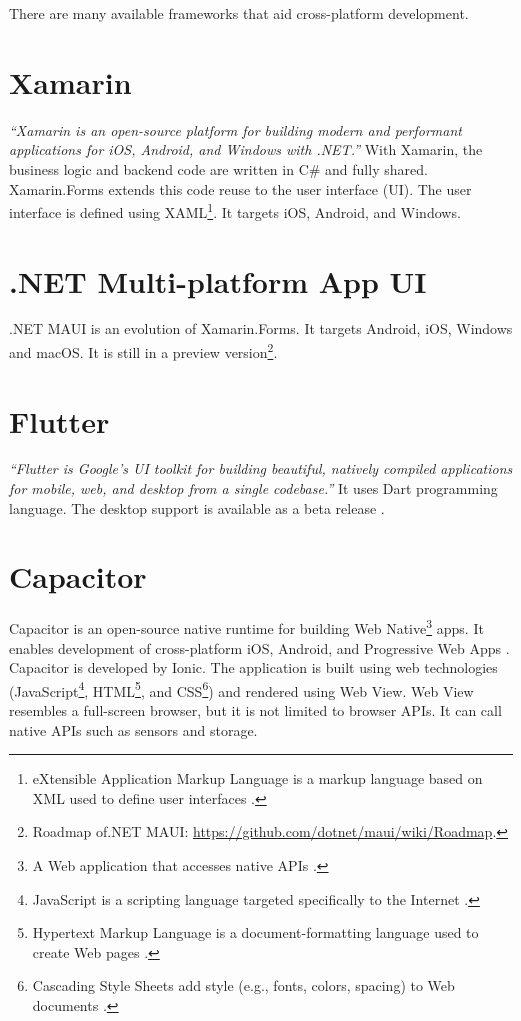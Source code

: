 \documentclass[
  printed, %
  table,   %
  oneside, %
  lof,     %
  lot,     %
]{fithesis3}
\begin{document}
There are many available frameworks that aid cross-platform development.

\section{Xamarin}
\textit{``Xamarin is an open-source platform for building modern and performant applications for iOS, Android, and Windows with .NET.''} \cite{WhatIsXamarin} With Xamarin, the business logic and backend code are written in C\# and fully shared.
Xamarin.Forms extends this code reuse to the user interface (UI). The user interface is defined using XAML\footnote{eXtensible Application Markup Language is a markup language based on XML used to define user interfaces \cite{Hermes2019Building}.}. It targets iOS, Android, and Windows.

\section{.NET Multi-platform App UI}
.NET MAUI is an evolution of Xamarin.Forms. It targets Android, iOS, Windows and macOS. It is still in a preview version\footnote{Roadmap of.NET MAUI: \url{https://github.com/dotnet/maui/wiki/Roadmap}.}.

\section{Flutter}
\textit{``Flutter is Google’s UI toolkit for building beautiful, natively compiled applications for mobile, web, and desktop from a single codebase.''} \cite{FlutterHomepage} It uses Dart programming language. The desktop support is available as a beta release \cite{FlutterDesktopSupport}.

\section{Capacitor}
Capacitor is an open-source native runtime for building Web Native\footnote{A Web application that accesses native APIs \cite{WebNative}.} apps. It enables development of cross-platform iOS, Android, and Progressive Web Apps \cite{CapacitorHomepage}. Capacitor is developed by Ionic. The application is built using web technologies (JavaScript\footnote{JavaScript is a scripting language targeted specifically to the Internet \cite{GartnerJavaScript}.}, HTML\footnote{Hypertext Markup Language is a document-formatting language used to create Web pages \cite{GartnerHTML}.}, and CSS\footnote{Cascading Style Sheets add style (e.g., fonts, colors, spacing) to Web documents \cite{W3CCSS}.}) and rendered using Web View. Web View resembles a full-screen browser, but it is not limited to browser APIs. It can call native APIs such as sensors and storage.
\end{document}
